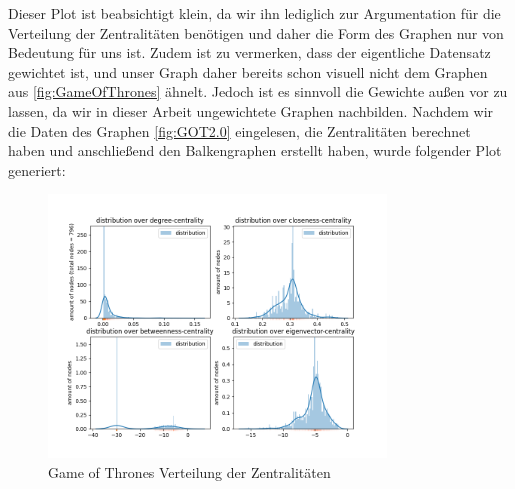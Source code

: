 Dieser Plot ist beabsichtigt klein, da wir ihn lediglich zur Argumentation für die Verteilung der Zentralitäten benötigen und daher die Form des Graphen nur von Bedeutung für uns ist. Zudem ist zu vermerken, dass der eigentliche Datensatz gewichtet ist, und unser Graph daher bereits schon visuell nicht dem Graphen aus \ref{fig:GameOfThrones} ähnelt. Jedoch ist es sinnvoll die Gewichte außen vor zu lassen, da wir in dieser Arbeit ungewichtete Graphen nachbilden. Nachdem wir die Daten des Graphen \ref{fig:GOT2.0} eingelesen, die Zentralitäten berechnet haben und anschließend den Balkengraphen erstellt haben, wurde folgender Plot generiert:

\FloatBarrier
\begin{figure}[h!]%
  \centering
   \includegraphics[width=0.8\textwidth]{Graphics/GOT-Distribution.png}
  \caption{Game of Thrones Verteilung der Zentralitäten}
  \label{fig:distributionGOT}
\end{figure}
\FloatBarrier
 
